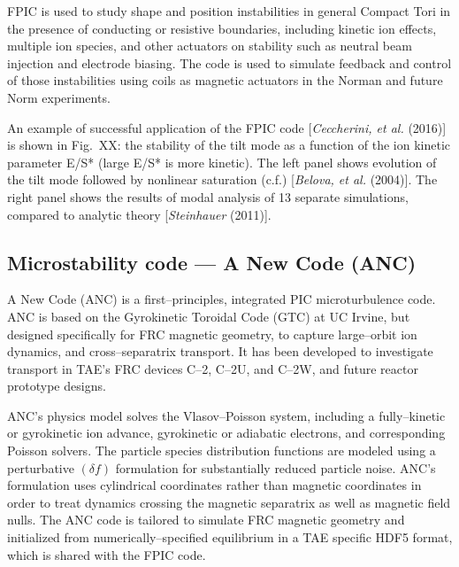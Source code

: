 \documentclass[a4paper,openany,12pt]{book}
\begin{document}
FPIC is used to study shape and position instabilities in general Compact Tori in the presence of conducting or resistive boundaries, including kinetic ion effects, multiple ion species, and other actuators on stability such as neutral beam injection and electrode biasing. The code is used to simulate feedback and control of those instabilities using coils as magnetic actuators in the Norman and future Norm experiments.

An example of successful application of the FPIC code [\emph{Ceccherini, et al.} (2016)] is shown in Fig.~XX: the stability of the tilt mode as a function of the ion kinetic parameter E/S* (large E/S* is more kinetic). The left panel shows evolution of the tilt mode followed by nonlinear saturation (c.f.) [\emph{Belova, et al.} (2004)]. The right panel shows the results of modal analysis of 13 separate simulations, compared to analytic theory [\emph{Steinhauer} (2011)].

\subsection{Microstability code --- A New Code (ANC)}

A New Code (ANC) is a first--principles, integrated PIC microturbulence code. ANC is based on the Gyrokinetic Toroidal Code (GTC) at UC Irvine, but designed specifically for FRC magnetic geometry, to capture large--orbit ion dynamics, and cross--separatrix transport. It has been developed to investigate transport in TAE's FRC devices C--2, C--2U, and C--2W, and future reactor prototype designs.

ANC's physics model solves the Vlasov--Poisson system, including a fully--kinetic or gyrokinetic ion advance, gyrokinetic or adiabatic electrons, and corresponding Poisson solvers. The particle species distribution functions are modeled using a perturbative $(\delta f)$ formulation for substantially reduced particle noise. ANC's formulation uses cylindrical coordinates rather than magnetic coordinates in order to treat dynamics crossing the magnetic separatrix as well as magnetic field nulls. The ANC code is tailored to simulate FRC magnetic geometry and initialized from numerically--specified equilibrium in a TAE specific HDF5 format, which is shared with the FPIC code.
\end{document}
